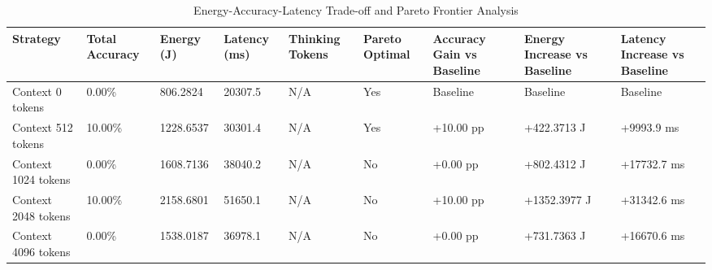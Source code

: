 \begin{table}
\caption{Energy-Accuracy-Latency Trade-off and Pareto Frontier Analysis}
\label{tab:tradeoff_comparison}
\begin{tabular}{lllllllll}
\toprule
Strategy & Total Accuracy & Energy (J) & Latency (ms) & Thinking Tokens & Pareto Optimal & Accuracy Gain vs Baseline & Energy Increase vs Baseline & Latency Increase vs Baseline \\
\midrule
Context 0 tokens & 0.00\% & 806.2824 & 20307.5 & N/A & Yes & Baseline & Baseline & Baseline \\
Context 512 tokens & 10.00\% & 1228.6537 & 30301.4 & N/A & Yes & +10.00 pp & +422.3713 J & +9993.9 ms \\
Context 1024 tokens & 0.00\% & 1608.7136 & 38040.2 & N/A & No & +0.00 pp & +802.4312 J & +17732.7 ms \\
Context 2048 tokens & 10.00\% & 2158.6801 & 51650.1 & N/A & No & +10.00 pp & +1352.3977 J & +31342.6 ms \\
Context 4096 tokens & 0.00\% & 1538.0187 & 36978.1 & N/A & No & +0.00 pp & +731.7363 J & +16670.6 ms \\
\bottomrule
\end{tabular}
\end{table}
